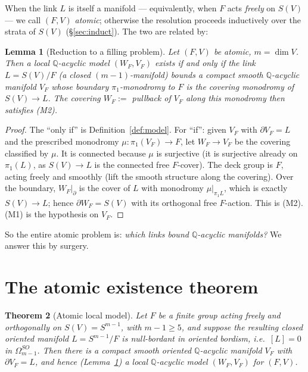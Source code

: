 \documentclass[12pt]{article}
\newtheorem{theorem}{Theorem}
\newtheorem{lemma}[theorem]{Lemma}
\theoremstyle{definition}
\begin{document}
When the link $L$ is itself a manifold --- equivalently, when $F$ acts
\emph{freely} on $S(V)$ --- we call $(F,V)$ \emph{atomic}; otherwise the
resolution proceeds inductively over the strata of $S(V)$ (\S\ref{sec:induct}).
The two are related by:

\begin{lemma}[Reduction to a filling problem]\label{lem:reduce}
Let $(F,V)$ be atomic, $m=\dim V$. Then a local $\mathbb{Q}$-acyclic model
$(W_F,V_F)$ exists if and only if the link $L=S(V)/F$ (a closed
$(m-1)$-manifold) bounds a compact smooth $\mathbb{Q}$-acyclic manifold $V_F$
whose boundary $\pi_1$-monodromy to $F$ is the covering monodromy of
$S(V)\to L$. The covering $W_F:=$ pullback of $V_F$ along this monodromy then
satisfies (M2).
\end{lemma}
\begin{proof}
The ``only if'' is Definition~\ref{def:model}. For ``if'': given $V_F$ with
$\partial V_F=L$ and the prescribed monodromy $\mu\colon\pi_1(V_F)\to F$,
let $W_F\to V_F$ be the covering classified by $\mu$. It is connected because
$\mu$ is surjective (it is surjective already on $\pi_1(L)$, as
$S(V)\to L$ is the connected free $F$-cover). The deck group is $F$, acting
freely and smoothly (lift the smooth structure along the covering). Over the
boundary, $W_F|_{\partial}$ is the cover of $L$ with monodromy $\mu|_{\pi_1L}$,
which is exactly $S(V)\to L$; hence $\partial W_F=S(V)$ with its orthogonal free
$F$-action. This is (M2). (M1) is the hypothesis on $V_F$.
\end{proof}

So the entire atomic problem is: \emph{which links bound $\mathbb{Q}$-acyclic
manifolds?} We answer this by surgery.

\section{The atomic existence theorem}\label{sec:atomic}

\begin{theorem}[Atomic local model]\label{thm:atomic}
Let $F$ be a finite group acting freely and orthogonally on $S(V)=S^{m-1}$,
with $m-1\ge5$, and suppose the resulting closed oriented manifold
$L=S^{m-1}/F$ is null-bordant in oriented bordism, i.e.\ $[L]=0$ in
$\Omega^{SO}_{m-1}$. Then there is a compact smooth oriented $\mathbb{Q}$-acyclic
manifold $V_F$ with $\partial V_F=L$, and hence (Lemma~\ref{lem:reduce}) a
local $\mathbb{Q}$-acyclic model $(W_F,V_F)$ for $(F,V)$.
\end{theorem}
\end{document}
